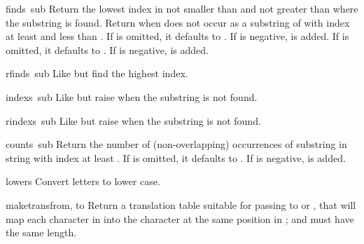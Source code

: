 \begin{funcdesc}{find}{s\, sub}
Return the lowest index in  not smaller than  and not 
greater than  where the substring  is found.  Return
 when  does not occur as a substring of  with
index at least  and less than .
If  is omitted, it defaults to .  If  is
negative,  is added.
If  is omitted, it defaults to .  If
 is negative,  is added.
\end{funcdesc}

\begin{funcdesc}{rfind}{s\, sub}
Like  but find the highest index.
\end{funcdesc}

\begin{funcdesc}{index}{s\, sub}
Like  but raise  when the substring is
not found.
\end{funcdesc}

\begin{funcdesc}{rindex}{s\, sub}
Like  but raise  when the substring is
not found.
\end{funcdesc}

\begin{funcdesc}{count}{s\, sub}
Return the number of (non-overlapping) occurrences of substring
 in string  with index at least .
If  is omitted, it defaults to .  If  is
negative,  is added.
\end{funcdesc}

\begin{funcdesc}{lower}{s}
Convert letters to lower case.
\end{funcdesc}

\begin{funcdesc}{maketrans}{from, to}
Return a translation table suitable for passing to 
or , that will map each character in  
into the character at the same position in ;  and
 must have the same length. 
\end{funcdesc}

